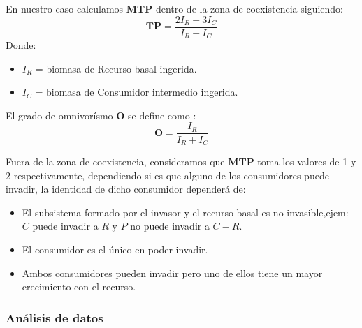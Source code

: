 En nuestro caso calculamos \textbf{MTP} dentro de la zona de coexistencia siguiendo:
\begin{equation} \mathbf{TP}= \frac{2 I_R + 3 I_C}{I_R+I_C} \end{equation}
Donde:
\begin{itemize}
\item $I_R$ = biomasa de Recurso basal ingerida.
\item $I_C$ = biomasa de Consumidor intermedio ingerida.
\end{itemize}
El grado de omnivor\'ismo $\mathbf{O}$ se define como \citep{TP2007proximate}:
\begin{equation} \mathbf{O}= \frac{I_R}{I_R+I_C} \end{equation}

Fuera de la zona de coexistencia, consideramos que \textbf{MTP} toma los valores de 1 y 2 respectivamente, dependiendo si es que alguno de los consumidores puede invadir, la identidad de dicho consumidor depender\'a de: 
\begin{itemize}
\item El subsistema formado por el invasor y el recurso basal es no invasible,ejem: $C$ puede invadir a $R$ y $P$ no puede invadir a $C-R$.
\item El consumidor es el \'unico en poder invadir.
\item Ambos consumidores pueden invadir pero uno de ellos tiene un mayor crecimiento con el recurso.
\end{itemize}

\subsubsection{An\'alisis de datos}
